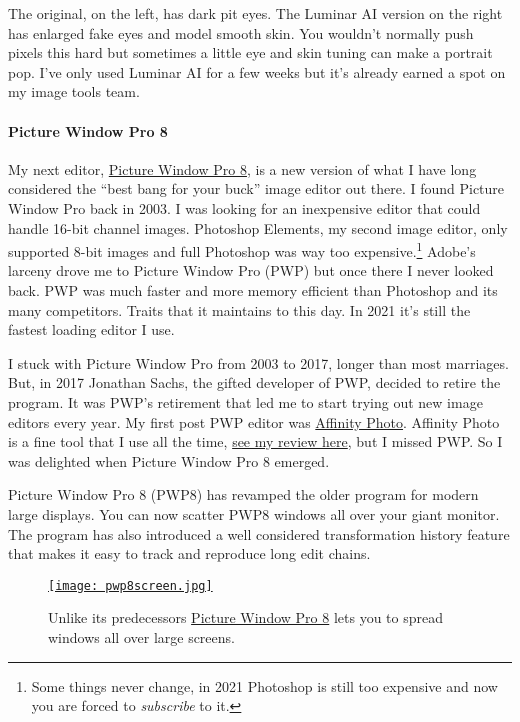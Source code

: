 The original, on the left, has dark pit eyes. The Luminar AI version on
the right has enlarged fake eyes and model smooth skin. You wouldn't
normally push pixels this hard but sometimes a little eye and skin
tuning can make a portrait pop. I've only used Luminar AI for a few
weeks but it's already earned a spot on my image tools team.

\paragraph{Picture Window Pro 8}\label{picture-window-pro-8}

My next editor, \href{https://www.dl-c.com/Downloads.html}{Picture
Window Pro 8}, is a new version of what I have long considered the
``best bang for your buck'' image editor out there. I found Picture
Window Pro back in 2003. I was looking for an inexpensive editor that
could handle 16-bit channel images. Photoshop Elements, my second image
editor, only supported 8-bit images and full Photoshop was way too
expensive.\footnote{Some things never change, in 2021 Photoshop is still too expensive and
  now you are forced to \emph{subscribe} to
  it.} Adobe's larceny
drove me to Picture Window Pro (PWP) but once there I never looked
back. PWP was much faster and more memory efficient than Photoshop and
its many competitors. Traits that it maintains to this day. In 2021
it's still the fastest loading editor I use.

I stuck with Picture Window Pro from 2003 to 2017, longer than most
marriages. But, in 2017 Jonathan Sachs, the gifted developer of PWP,
decided to retire the program. It was PWP's retirement that led me to
start trying out new image editors every year. My first post PWP editor
was \href{https://affinity.serif.com/en-gb/photo/}{Affinity Photo}.
Affinity Photo is a fine tool that I use all the time,
\href{https://analyzethedatanotthedrivel.org/2017/01/22/affinity-photo-review/}{see
my review here}, but I missed PWP. So I was delighted when Picture
Window Pro 8 emerged.

Picture Window Pro 8 (PWP8) has revamped the older program for modern
large displays. You can now scatter PWP8 windows all over your giant
monitor. The program has also introduced a well considered
transformation history feature that makes it easy to track and reproduce
long edit chains.


\captionsetup[figure]{labelformat=empty}
 \begin{SCfigure}[50]
 \centering
\href{https://bakerjd99.files.wordpress.com/2021/01/pwp8screen.jpg}{\texttt{[image: pwp8screen.jpg]}}
\caption{Unlike its predecessors \href{https://www.dl-c.com/Downloads.html}{Picture Window Pro 8} lets you to
spread  windows all over large screens.} 
\label{fig:7048X4}
\end{SCfigure}


